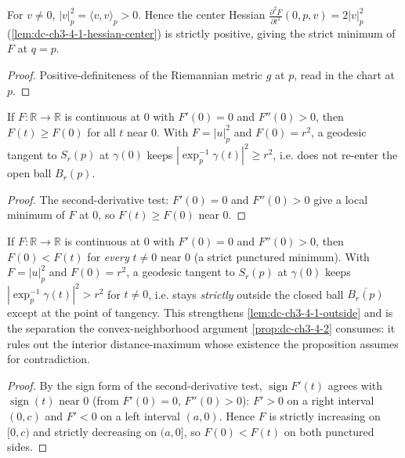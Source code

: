 \begin{lemma}
  \label{lem:dc-ch3-4-1-posdef}


  For $v\neq0$, $|v|_p^2=\langle v,v\rangle_p>0$. Hence the center Hessian
  $\frac{\partial^2 F}{\partial t^2}(0,p,v)=2|v|_p^2$
  (\cref{lem:dc-ch3-4-1-hessian-center}) is strictly positive, giving the
  strict minimum of $F$ at $q=p$.
\end{lemma}
\begin{proof}
  \sketch

  Positive-definiteness of the Riemannian metric $g$ at $p$, read in the chart
  at $p$.
\end{proof}

\begin{lemma}
  \label{lem:dc-ch3-4-1-outside}


  If $F:\mathbb{R}\to\mathbb{R}$ is continuous at $0$ with $F'(0)=0$ and
  $F''(0)>0$, then $F(t)\ge F(0)$ for all $t$ near $0$. With $F=|u|_p^2$ and
  $F(0)=r^2$, a geodesic tangent to $S_r(p)$ at $\gamma(0)$ keeps
  $|\exp_p^{-1}\gamma(t)|^2\ge r^2$, i.e. does not re-enter the open ball
  $B_r(p)$.
\end{lemma}
\begin{proof}
  \sketch

  The second-derivative test: $F'(0)=0$ and $F''(0)>0$ give a local minimum of
  $F$ at $0$, so $F(t)\ge F(0)$ near $0$.
\end{proof}

\begin{lemma}
  \label{lem:dc-ch3-4-1-strict-outside}


  If $F:\mathbb{R}\to\mathbb{R}$ is continuous at $0$ with $F'(0)=0$ and
  $F''(0)>0$, then $F(0)<F(t)$ for \emph{every} $t\neq0$ near $0$ (a strict
  punctured minimum). With $F=|u|_p^2$ and $F(0)=r^2$, a geodesic tangent to
  $S_r(p)$ at $\gamma(0)$ keeps $|\exp_p^{-1}\gamma(t)|^2>r^2$ for $t\neq0$, i.e.
  stays \emph{strictly} outside the closed ball $\overline{B_r(p)}$ except at the
  point of tangency. This strengthens \cref{lem:dc-ch3-4-1-outside} and is the
  separation the convex-neighborhood argument \cref{prop:dc-ch3-4-2}
  consumes: it rules out the interior distance-maximum whose existence the
  proposition assumes for contradiction.
\end{lemma}
\begin{proof}
  \sketch

  By the sign form of the second-derivative test, $\operatorname{sign} F'(t)$
  agrees with $\operatorname{sign}(t)$ near $0$ (from $F'(0)=0$, $F''(0)>0$): $F'>0$
  on a right interval $(0,c)$ and $F'<0$ on a left interval $(a,0)$. Hence $F$ is
  strictly increasing on $[0,c)$ and strictly decreasing on $(a,0]$, so $F(0)<F(t)$
  on both punctured sides.
\end{proof}

